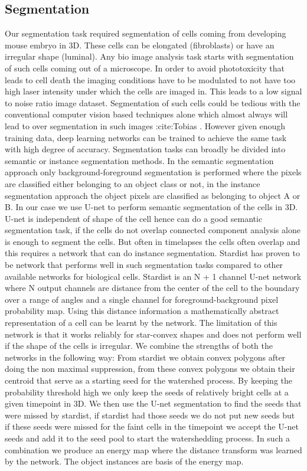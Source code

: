 \documentclass[letterpaper,compsoc,twoside]{IEEEtran}
\begin{document}
\subsection{Segmentation%
  \label{segmentation}%
}


Our segmentation task required segmentation of cells coming from developing mouse embryo in 3D. These cells can be elongated (fibroblasts) or have an irregular shape (luminal). Any bio image analysis task starts with segmentation of such cells coming out of a microscope. In order to avoid phototoxicity that leads to cell death the imaging conditions have to be modulated to not have too high laser intensity under which the cells are imaged in. This leads to a low signal to noise ratio image dataset. Segmentation of such cells could be tedious with the conventional computer vision based techniques alone which almost always will lead to over segmentation in such images :cite:Tobias . However given enough training data, deep learning networks can be trained to achieve the same task with high degree of accuracy. Segmentation tasks can broadly be divided into semantic or instance segmentation methods. In the semantic segmentation approach only background-foreground segmentation is performed where the pixels are classified either belonging to an object class or not, in the instance segmentation approach the object pixels are classified as belonging to object A or B. In our case we use U-net to perform semantic segmentation of the cells in 3D. U-net is independent of shape of the cell hence can do a good semantic segmentation task, if the cells do not overlap connected component analysis alone is enough to segment the cells. But often in timelapses the cells often overlap and this requires a network that can do instance segmentation. Stardist has proven to be network that performs well in such segmentation tasks compared to other available networks for biological cells. Stardist is an N + 1 channel U-net network where N output channels are distance from the center of the cell to the boundary over a range of angles and a single channel for foreground-background pixel probability map. Using this distance information a mathematically abstract representation of a cell can be learnt by the network. The limitation of this network is that it works reliably for star-convex shapes and does not perform well if the shape of the cells is irregular. We combine the strengths of both the networks in the following way: From stardist we obtain convex polygons after doing the non maximal suppression, from these convex polygons we obtain their centroid that serve as a starting seed for the watershed process. By keeping the probability threshold high we only keep the seeds of relatively bright cells at a given timepoint in 3D. We then use the U-net segmentation to find the seeds that were missed by stardist, if stardist had those seeds we do not put new seeds but if these seeds were missed for the faint cells in the timepoint we accept the U-net seeds and add it to the seed pool to start the watershedding process. In such a combination we produce an energy map where the distance transform was learned by the network. The object instances are basis of the energy map.
\end{document}
